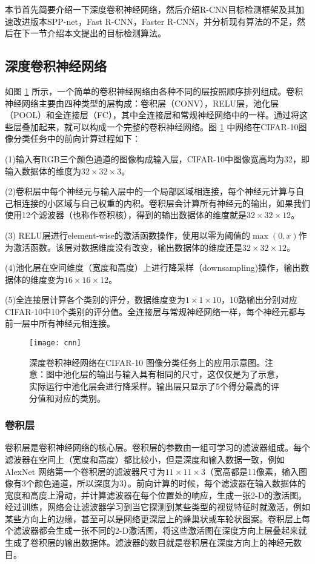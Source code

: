 本节首先简要介绍一下深度卷积神经网络，然后介绍R-CNN目标检测框架及其加速改进版本SPP-net，Fast R-CNN，Faster R-CNN，并分析现有算法的不足，然后在下一节介绍本文提出的目标检测算法。

\subsection{深度卷积神经网络}
如图 \ref{cnn} 所示，一个简单的卷积神经网络由各种不同的层按照顺序排列组成。卷积神经网络主要由四种类型的层构成：卷积层（CONV），RELU层，池化层（POOL）和全连接层（FC），其中全连接层和常规神经网络中的一样。通过将这些层叠加起来，就可以构成一个完整的卷积神经网络。图 \ref{cnn} 中网络在CIFAR-10图像分类任务中的前向计算过程如下：
\begin{namelist}{}
	\item (1)输入有RGB三个颜色通道的图像构成输入层，CIFAR-10中图像宽高均为32，即输入数据体的维度为$32\times32\times3$。
	\item (2)卷积层中每个神经元与输入层中的一个局部区域相连接，每个神经元计算与自己相连接的小区域与自己权重的内积。卷积层会计算所有神经元的输出，如果我们使用12个滤波器（也称作卷积核），得到的输出数据体的维度就是$32\times32\times12$。
	\item (3) RELU层进行element-wise的激活函数操作，使用以零为阈值的$\max(0,x)$作为激活函数。该层对数据维度没有改变，输出数据体的维度还是$32\times32\times12$。
	\item
	(4)池化层在空间维度（宽度和高度）上进行降采样（downsampling)操作，输出数据体的维度变为$16\times16\times12$。
	\item
	(5)全连接层计算各个类别的评分，数据维度变为$1\times1\times10$，10路输出分别对应CIFAR-10中10个类别的评分值。全连接层与常规神经网络一样，每个神经元都与前一层中所有神经元相连接。
\end{namelist}
\begin{figure}[!t]
	\centering
	\texttt{[image: cnn]}
	\caption{深度卷积神经网络在CIFAR-10 \cite{cifar-10} 图像分类任务上的应用示意图。注意：图中池化层的输出与输入具有相同的尺寸，这仅仅是为了示意，实际运行中池化层会进行降采样。输出层只显示了5个得分最高的评分值和对应的类别。}
	\label{cnn}
\end{figure}

\subsubsection{卷积层}
卷积层是卷积神经网络的核心层。卷积层的参数由一组可学习的滤波器组成。每个滤波器在空间上（宽度和高度）都比较小，但是深度和输入数据一致，例如AlexNet \cite{alexnet} 网络第一个卷积层的滤波器尺寸为$11\times11\times3$（宽高都是11像素，输入图像有3个颜色通道，所以深度为3）。前向计算的时候，每个滤波器在输入数据体的宽度和高度上滑动，并计算滤波器在每个位置处的响应，生成一张2-D的激活图。经过训练，网络会让滤波器学习到当它探测到某些类型的视觉特征时就激活，例如某些方向上的边缘，甚至可以是网络更深层上的蜂巢状或车轮状图案。卷积层上每个滤波器都会生成一张不同的2-D激活图，将这些激活图在深度方向上层叠起来就生成了卷积层的输出数据体。滤波器的数目就是卷积层在深度方向上的神经元数目。

